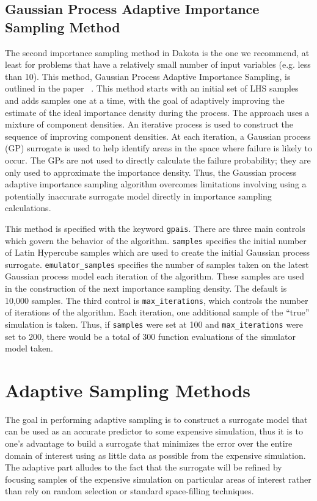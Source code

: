 \subsection{Gaussian Process Adaptive Importance Sampling Method}\label{uq:gpais}
The second importance sampling method in Dakota is the one we recommend,
at least for problems that have a relatively small number of input variables (e.g.
less than 10). This method, Gaussian Process Adaptive Importance Sampling,
is outlined in the paper ~\cite{Dalbey2014}.
This method  starts with an initial set of LHS samples and adds samples one at a time, 
with the goal of adaptively improving the estimate of the ideal importance density
during the process. The approach uses a mixture of component densities. An
iterative process is used
to construct the sequence of improving component densities. At each
iteration, a Gaussian process (GP) surrogate is used to help identify areas
in the space where failure is likely to occur. The GPs are not used to
directly calculate the failure probability; they are only used to approximate
the importance density. Thus, the Gaussian process adaptive importance
sampling algorithm overcomes limitations involving using a potentially
inaccurate surrogate model directly in importance sampling calculations.

This method is specified with the keyword \texttt{gpais}. There are three 
main controls which govern the behavior of the algorithm. 
\texttt{samples} specifies the initial number of Latin Hypercube samples 
which are used to create the initial Gaussian process surrogate. 
\texttt{emulator\_samples} specifies the number of samples taken on the 
latest Gaussian process model each iteration of the algorithm. 
These samples are used in the construction of the next importance 
sampling density. The default is 10,000 samples. The third control 
is \texttt{max\_iterations}, which controls the number of iterations 
of the algorithm. Each iteration, one additional sample of the ``true'' 
simulation is taken. Thus, if \texttt{samples} were set at 100 and 
\texttt{max\_iterations} were set to 200, there would be a total of 
300 function evaluations of the simulator model taken. 

\section{Adaptive Sampling Methods}\label{uq:adaptive}
The goal in performing adaptive sampling is to construct a surrogate model that
can be used as an accurate predictor to some expensive simulation, thus it is
to one's advantage to build a surrogate that minimizes the error over the entire
domain of interest using as little data as possible from the expensive
simulation. The adaptive part alludes to the fact that the surrogate will be
refined by focusing samples of the expensive simulation on particular areas of
interest rather than rely on random selection or standard space-filling
techniques. 

